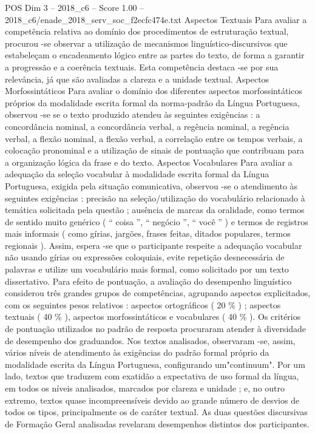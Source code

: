 \begin{textsample}{POS Dim 3 – 2018\_c6 – Score 1.00 – 2018\_c6/enade\_2018\_serv\_soc\_f2ecfc474e.txt}
Aspectos Textuais Para avaliar a competência relativa ao domínio dos procedimentos de estruturação textual, procurou -se observar a utilização de mecanismos linguístico-discursivos que estabeleçam o encadeamento lógico entre as partes do texto, de forma a garantir a progressão e a coerência textuais.
Esta competência destaca -se por sua relevância, já que são avaliadas a clareza e a unidade textual.
Aspectos Morfossintáticos Para avaliar o domínio dos diferentes aspectos morfossintáticos próprios da modalidade escrita formal da norma-padrão da Língua Portuguesa, observou -se se o texto produzido atendeu às seguintes exigências : a concordância nominal, a concordância verbal, a regência nominal, a regência verbal, a flexão nominal, a flexão verbal, a correlação entre os tempos verbais, a colocação pronominal e a utilização de sinais de pontuação que contribuam para a organização lógica da frase e do texto.
Aspectos Vocabulares Para avaliar a adequação da seleção vocabular à modalidade escrita formal da Língua Portuguesa, exigida pela situação comunicativa, observou -se o atendimento às seguintes exigências : precisão na seleção/utilização do vocabulário relacionado à temática solicitada pela questão ; ausência de marcas da oralidade, como termos de sentido muito genérico ( “ coisa ”, “ negócio ”, “ você ” ) e termos de registros mais informais ( como gírias, jargões, frases feitas, ditados populares, termos regionais ).
Assim, espera -se que o participante respeite a adequação vocabular não usando gírias ou expressões coloquiais, evite repetição desnecessária de palavras e utilize um vocabulário mais formal, como solicitado por um texto dissertativo.
Para efeito de pontuação, a avaliação do desempenho linguístico considerou três grandes grupos de competências, agrupando aspectos explicitados, com os seguintes pesos relativos : aspectos ortográficos ( 20 \% ) ; aspectos textuais ( 40 \% ), aspectos morfossintáticos e vocabulares ( 40 \% ).
Os critérios de pontuação utilizados no padrão de resposta procuraram atender à diversidade de desempenho dos graduandos.
Nos textos analisados, observaram -se, assim, vários níveis de atendimento às exigências do padrão formal próprio da modalidade escrita da Língua Portuguesa, configurando um"continuum".
Por um lado, textos que traduzem com exatidão a expectativa de uso formal da língua, em todos os níveis analisados, marcados por clareza e unidade ; e, no outro extremo, textos quase incompreensíveis devido ao grande número de desvios de todos os tipos, principalmente os de caráter textual.
As duas questões discursivas de Formação Geral analisadas revelaram desempenhos distintos dos participantes.

\end{textsample}
